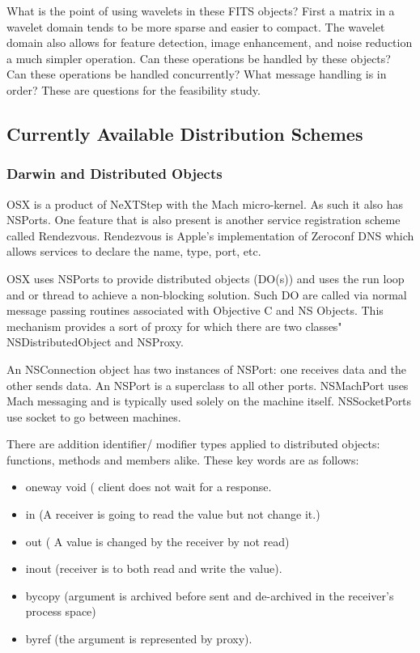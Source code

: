 \documentclass[11pt]{article}
\begin{document}
What is the point of using wavelets in these FITS objects?  First a matrix in a wavelet domain tends to be more sparse and easier to compact.  The wavelet domain also allows for feature detection,  image enhancement,  and noise reduction a much simpler operation.   Can these operations be handled by  these objects?  Can these operations be handled concurrently?  What message handling is in order?  These are questions for the feasibility study.  %



\subsection {Currently Available Distribution Schemes}
\subsubsection {Darwin and Distributed Objects}
OSX is a product of NeXTStep with the Mach micro-kernel.  As such it also has NSPorts.  One feature that is also present is another service registration scheme called Rendezvous.    Rendezvous is Apple's implementation of Zeroconf DNS which allows services to declare the name, type, port, etc.  

OSX uses NSPorts to provide distributed objects (DO(s)) and uses the run loop and or thread  to achieve a non-blocking solution.  Such DO are called via normal message passing routines associated with Objective C and NS Objects.  This mechanism provides a sort of proxy for which there are two classes"  NSDistributedObject and NSProxy.  

An NSConnection object has two instances of NSPort: one receives data and the other sends data.   An NSPort is a superclass to all other ports.  NSMachPort uses Mach messaging and is typically used solely on the machine itself.  NSSocketPorts use socket to go between machines.  

There are addition identifier/ modifier types applied to distributed objects: functions, methods and members alike.  These key words are as follows:
\begin{itemize}
\item oneway void ( client does not wait for a response.
\item in (A receiver is going to read the value but not change it.)
\item out ( A value is changed by the receiver by not read)
\item inout (receiver is to both read and write  the value).
\item bycopy (argument is archived before sent and de-archived in the receiver's process space)
\item byref (the argument is represented by proxy).   
\end{itemize}
\end{document}
